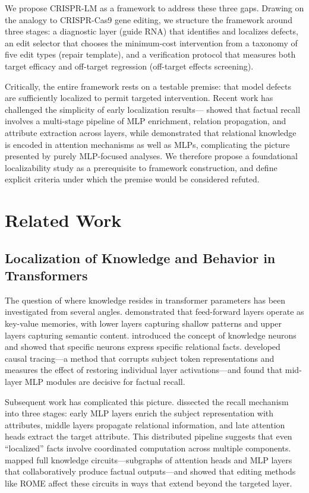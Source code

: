 \documentclass[11pt]{article}
\begin{document}
We propose CRISPR-LM as a framework to address these three gaps. Drawing on the analogy to CRISPR-Cas9 gene editing, we structure the framework around three stages: a diagnostic layer (guide RNA) that identifies and localizes defects, an edit selector that chooses the minimum-cost intervention from a taxonomy of five edit types (repair template), and a verification protocol that measures both target efficacy and off-target regression (off-target effects screening).

Critically, the entire framework rests on a testable premise: that model defects are sufficiently localized to permit targeted intervention. Recent work has challenged the simplicity of early localization results---\citet{geva2023dissecting} showed that factual recall involves a multi-stage pipeline of MLP enrichment, relation propagation, and attribute extraction across layers, while \citet{wei2024localization} demonstrated that relational knowledge is encoded in attention mechanisms as well as MLPs, complicating the picture presented by purely MLP-focused analyses. We therefore propose a foundational localizability study as a prerequisite to framework construction, and define explicit criteria under which the premise would be considered refuted.

\section{Related Work}

\subsection{Localization of Knowledge and Behavior in Transformers}

The question of where knowledge resides in transformer parameters has been investigated from several angles. \citet{geva2021feedforward} demonstrated that feed-forward layers operate as key-value memories, with lower layers capturing shallow patterns and upper layers capturing semantic content. \citet{dai2022knowledge} introduced the concept of knowledge neurons and showed that specific neurons express specific relational facts. \citet{meng2022locating} developed causal tracing---a method that corrupts subject token representations and measures the effect of restoring individual layer activations---and found that mid-layer MLP modules are decisive for factual recall.

Subsequent work has complicated this picture. \citet{geva2023dissecting} dissected the recall mechanism into three stages: early MLP layers enrich the subject representation with attributes, middle layers propagate relational information, and late attention heads extract the target attribute. This distributed pipeline suggests that even ``localized'' facts involve coordinated computation across multiple components. \citet{yao2024circuits} mapped full knowledge circuits---subgraphs of attention heads and MLP layers that collaboratively produce factual outputs---and showed that editing methods like ROME affect these circuits in ways that extend beyond the targeted layer.
\end{document}
